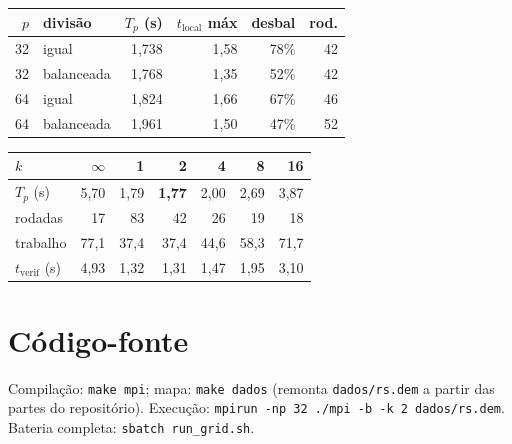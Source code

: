 \documentclass[9pt,a4paper]{extarticle}
\newcommand{\tl}{t_{\mathrm{local}}}
\begin{document}
\begin{minipage}[t]{0.42\linewidth}
\centering\small\setlength{\tabcolsep}{3.5pt}
\begin{tabular}{rlrrrr}\toprule
$p$ & divisão & $T_p$ (s) & $\tl$ máx & desbal & rod.\\\midrule
32 & igual      & 1,738 & 1,58 & 78\% & 42\\
32 & balanceada & 1,768 & 1,35 & 52\% & 42\\
64 & igual      & 1,824 & 1,66 & 67\% & 46\\
64 & balanceada & 1,961 & 1,50 & 47\% & 52\\\bottomrule
\end{tabular}

\vspace{6pt}
\setlength{\tabcolsep}{3.5pt}
\begin{tabular}{lrrrrrr}\toprule
$k$ & $\infty$ & 1 & 2 & 4 & 8 & 16\\\midrule
$T_p$ (s) & 5,70 & 1,79 & \textbf{1,77} & 2,00 & 2,69 & 3,87\\
rodadas & 17 & 83 & 42 & 26 & 19 & 18\\
trabalho & 77,1 & 37,4 & 37,4 & 44,6 & 58,3 & 71,7\\
$t_{\mathrm{verif}}$ (s) & 4,93 & 1,32 & 1,31 & 1,47 & 1,95 & 3,10\\\bottomrule
\end{tabular}
\end{minipage}

\newpage
\section*{Código-fonte}
Compilação: \texttt{make mpi}; mapa: \texttt{make dados} (remonta \texttt{dados/rs.dem} a partir das partes do repositório). Execução: \texttt{mpirun -np 32 ./mpi -b -k 2 dados/rs.dem}. Bateria completa: \texttt{sbatch run\_grid.sh}.




\end{document}
